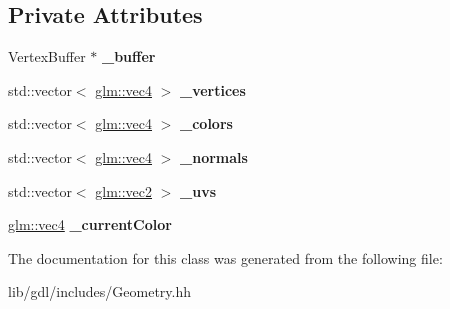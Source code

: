 \subsection*{Private Attributes}
\begin{DoxyCompactItemize}
\item 
\hypertarget{classgdl_1_1_geometry_a701ce247c8e544e8016f8098acd1d1c1}{}Vertex\+Buffer $\ast$ {\bfseries \+\_\+buffer}\label{classgdl_1_1_geometry_a701ce247c8e544e8016f8098acd1d1c1}

\item 
\hypertarget{classgdl_1_1_geometry_ab4ed295013a720a3e871a4531c53245f}{}std\+::vector$<$ \hyperlink{group__core__types_gae9c89157f980f7247cdee8bf55787035}{glm\+::vec4} $>$ {\bfseries \+\_\+vertices}\label{classgdl_1_1_geometry_ab4ed295013a720a3e871a4531c53245f}

\item 
\hypertarget{classgdl_1_1_geometry_aa999936e3bc2bb7c7bc9e9314e2f2df8}{}std\+::vector$<$ \hyperlink{group__core__types_gae9c89157f980f7247cdee8bf55787035}{glm\+::vec4} $>$ {\bfseries \+\_\+colors}\label{classgdl_1_1_geometry_aa999936e3bc2bb7c7bc9e9314e2f2df8}

\item 
\hypertarget{classgdl_1_1_geometry_a41df7e65df7500fb1b83e09260b1c468}{}std\+::vector$<$ \hyperlink{group__core__types_gae9c89157f980f7247cdee8bf55787035}{glm\+::vec4} $>$ {\bfseries \+\_\+normals}\label{classgdl_1_1_geometry_a41df7e65df7500fb1b83e09260b1c468}

\item 
\hypertarget{classgdl_1_1_geometry_a0d0a522d32e09eada6d5803ec006ad61}{}std\+::vector$<$ \hyperlink{group__core__types_ga66d091b759687504ab01365fbd33a1dd}{glm\+::vec2} $>$ {\bfseries \+\_\+uvs}\label{classgdl_1_1_geometry_a0d0a522d32e09eada6d5803ec006ad61}

\item 
\hypertarget{classgdl_1_1_geometry_a2877b29791a47a9680c6d3a94eeeabd3}{}\hyperlink{group__core__types_gae9c89157f980f7247cdee8bf55787035}{glm\+::vec4} {\bfseries \+\_\+current\+Color}\label{classgdl_1_1_geometry_a2877b29791a47a9680c6d3a94eeeabd3}

\end{DoxyCompactItemize}


The documentation for this class was generated from the following file\+:\begin{DoxyCompactItemize}
\item 
lib/gdl/includes/Geometry.\+hh\end{DoxyCompactItemize}
